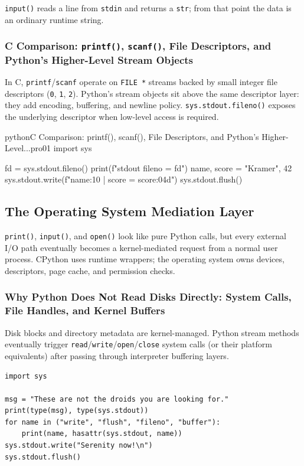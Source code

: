 \documentclass[a4paper,twoside]{report}
\begin{document}
\texttt{input()} reads a line from \texttt{stdin} and returns a \texttt{str}; from that point the data is an ordinary runtime string.

\subsubsection{C Comparison: \texttt{printf()}, \texttt{scanf()}, File Descriptors, and Python's Higher-Level Stream Objects}

In C, \texttt{printf}/\texttt{scanf} operate on \texttt{FILE *} streams backed by small integer file descriptors (\texttt{0}, \texttt{1}, \texttt{2}). Python's stream objects sit above the same descriptor layer: they add encoding, buffering, and newline policy. \texttt{sys.stdout.fileno()} exposes the underlying descriptor when low-level access is required.

\begin{codebox}[]{python}{C Comparison: printf(), scanf(), File Descriptors, and Python's Higher-Level...}{pro01}
import sys

fd = sys.stdout.fileno()
print(f"stdout fileno = {fd}")
name, score = "Kramer", 42
sys.stdout.write(f"{name:10} | score = {score:04d}\n")
sys.stdout.flush()
\end{codebox}




\subsection{The Operating System Mediation Layer}

\texttt{print()}, \texttt{input()}, and \texttt{open()} look like pure Python calls, but every external I/O path eventually becomes a kernel-mediated request from a normal user process. CPython uses runtime wrappers; the operating system owns devices, descriptors, page cache, and permission checks.

\subsubsection{Why Python Does Not Read Disks Directly: System Calls, File Handles, and Kernel Buffers}

Disk blocks and directory metadata are kernel-managed. Python stream methods eventually trigger \texttt{read}/\texttt{write}/\texttt{open}/\texttt{close} system calls (or their platform equivalents) after passing through interpreter buffering layers.

\begin{verbatim}
import sys

msg = "These are not the droids you are looking for."
print(type(msg), type(sys.stdout))
for name in ("write", "flush", "fileno", "buffer"):
    print(name, hasattr(sys.stdout, name))
sys.stdout.write("Serenity now!\n")
sys.stdout.flush()
\end{verbatim}
\end{document}
